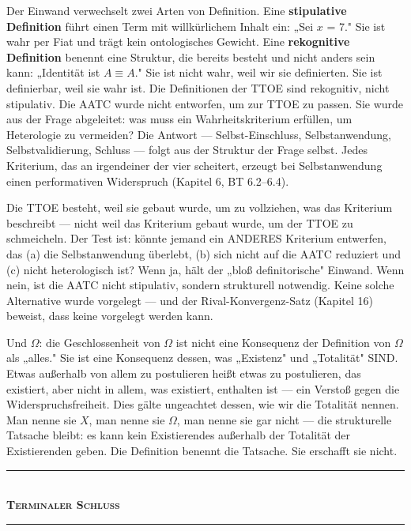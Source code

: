 \documentclass[10pt, openany, oneside]{book}
\renewcommand{\normalsize}{\fontsize{10}{13}\selectfont}
\begin{document}
Der Einwand verwechselt zwei Arten von Definition. Eine \textbf{stipulative Definition} führt einen Term mit willkürlichem Inhalt ein: „Sei $x$ = 7." Sie ist wahr per Fiat und trägt kein ontologisches Gewicht. Eine \textbf{rekognitive Definition} benennt eine Struktur, die bereits besteht und nicht anders sein kann: „Identität ist $A \equiv A$." Sie ist nicht wahr, weil wir sie definierten. Sie ist definierbar, weil sie wahr ist. Die Definitionen der TTOE sind rekognitiv, nicht stipulativ. Die AATC wurde nicht entworfen, um zur TTOE zu passen. Sie wurde aus der Frage abgeleitet: was muss ein Wahrheitskriterium erfüllen, um Heterologie zu vermeiden? Die Antwort --- Selbst-Einschluss, Selbstanwendung, Selbstvalidierung, Schluss --- folgt aus der Struktur der Frage selbst. Jedes Kriterium, das an irgendeiner der vier scheitert, erzeugt bei Selbstanwendung einen performativen Widerspruch (Kapitel 6, BT 6.2--6.4).

Die TTOE besteht, weil sie gebaut wurde, um zu vollziehen, was das Kriterium beschreibt --- nicht weil das Kriterium gebaut wurde, um der TTOE zu schmeicheln. Der Test ist: könnte jemand ein ANDERES Kriterium entwerfen, das (a) die Selbstanwendung überlebt, (b) sich nicht auf die AATC reduziert und (c) nicht heterologisch ist? Wenn ja, hält der „bloß definitorische" Einwand. Wenn nein, ist die AATC nicht stipulativ, sondern strukturell notwendig. Keine solche Alternative wurde vorgelegt --- und der Rival-Konvergenz-Satz (Kapitel 16) beweist, dass keine vorgelegt werden kann.

Und $\Omega$: die Geschlossenheit von $\Omega$ ist nicht eine Konsequenz der Definition von $\Omega$ als „alles." Sie ist eine Konsequenz dessen, was „Existenz" und „Totalität" SIND. Etwas außerhalb von allem zu postulieren heißt etwas zu postulieren, das existiert, aber nicht in allem, was existiert, enthalten ist --- ein Verstoß gegen die Widerspruchsfreiheit. Dies gälte ungeachtet dessen, wie wir die Totalität nennen. Man nenne sie $X$, man nenne sie $\Omega$, man nenne sie gar nicht --- die strukturelle Tatsache bleibt: es kann kein Existierendes außerhalb der Totalität der Existierenden geben. Die Definition benennt die Tatsache. Sie erschafft sie nicht.

\vspace{1.5em}


\begin{center}
    \rule{0.3\textwidth}{0.4pt}\\[0.5em]
    {\normalsize\bfseries\scshape Terminaler Schluss}\\[0.3em]
    \rule{0.3\textwidth}{0.4pt}
\end{center}
\end{document}
